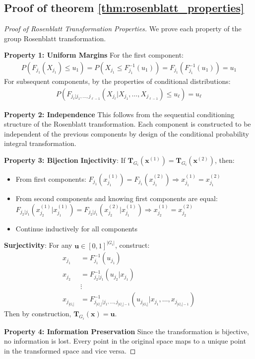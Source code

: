 \subsection{Proof of theorem \ref{thm:rosenblatt_properties}}
\begin{proof}[Proof of Rosenblatt Transformation Properties]
We prove each property of the group Rosenblatt transformation.

\textbf{Property 1: Uniform Margins}
For the first component:
\begin{align}
P(F_{j_1}(X_{j_1}) \leq u_1) = P(X_{j_1} \leq F_{j_1}^{-1}(u_1)) = F_{j_1}(F_{j_1}^{-1}(u_1)) = u_1
\end{align}
For subsequent components, by the properties of conditional distributions:
\begin{align}
P(F_{j_\ell|j_1,\ldots,j_{\ell-1}}(X_{j_\ell}|X_{j_1}, \ldots, X_{j_{\ell-1}}) \leq u_\ell) = u_\ell
\end{align}

\textbf{Property 2: Independence}
This follows from the sequential conditioning structure of the Rosenblatt transformation. Each component is constructed to be independent of the previous components by design of the conditional probability integral transformation.

\textbf{Property 3: Bijection}
\textbf{Injectivity}: If $\mathbf{T}_{G_i}(\mathbf{x}^{(1)}) = \mathbf{T}_{G_i}(\mathbf{x}^{(2)})$, then:
\begin{itemize}
    \item From first components: $F_{j_1}(x_{j_1}^{(1)}) = F_{j_1}(x_{j_1}^{(2)}) \Rightarrow x_{j_1}^{(1)} = x_{j_1}^{(2)}$
    \item From second components and knowing first components are equal: $F_{j_2|j_1}(x_{j_2}^{(1)}|x_{j_1}^{(1)}) = F_{j_2|j_1}(x_{j_2}^{(2)}|x_{j_1}^{(1)}) \Rightarrow x_{j_2}^{(1)} = x_{j_2}^{(2)}$
    \item Continue inductively for all components
\end{itemize}
\textbf{Surjectivity}: For any $\mathbf{u} \in [0,1]^{|G_i|}$, construct:
\begin{align}
x_{j_1} &= F_{j_1}^{-1}(u_{j_1}) \\
x_{j_2} &= F_{j_2|j_1}^{-1}(u_{j_2}|x_{j_1}) \\
&\vdots \\
x_{j_{|G_i|}} &= F_{j_{|G_i|}|j_1,\ldots,j_{|G_i|-1}}^{-1}(u_{j_{|G_i|}}|x_{j_1}, \ldots, x_{j_{|G_i|-1}})
\end{align}
Then by construction, $\mathbf{T}_{G_i}(\mathbf{x}) = \mathbf{u}$.

\textbf{Property 4: Information Preservation}
Since the transformation is bijective, no information is lost. Every point in the original space maps to a unique point in the transformed space and vice versa.
\end{proof}

